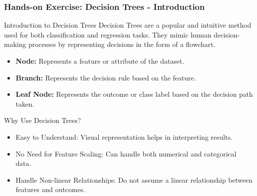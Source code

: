 \documentclass[aspectratio=169]{beamer}
\begin{document}
\begin{frame}[fragile]
    \frametitle{Hands-on Exercise: Decision Trees - Introduction}
    \begin{block}{Introduction to Decision Trees}
        Decision Trees are a popular and intuitive method used for both classification and regression tasks. They mimic human decision-making processes by representing decisions in the form of a flowchart.
    \end{block}

    \begin{itemize}
        \item \textbf{Node:} Represents a feature or attribute of the dataset.
        \item \textbf{Branch:} Represents the decision rule based on the feature.
        \item \textbf{Leaf Node:} Represents the outcome or class label based on the decision path taken.
    \end{itemize}
    
    \begin{block}{Why Use Decision Trees?}
        \begin{itemize}
            \item Easy to Understand: Visual representation helps in interpreting results.
            \item No Need for Feature Scaling: Can handle both numerical and categorical data.
            \item Handle Non-linear Relationships: Do not assume a linear relationship between features and outcomes.
        \end{itemize}
    \end{block}
\end{frame}
\end{document}

